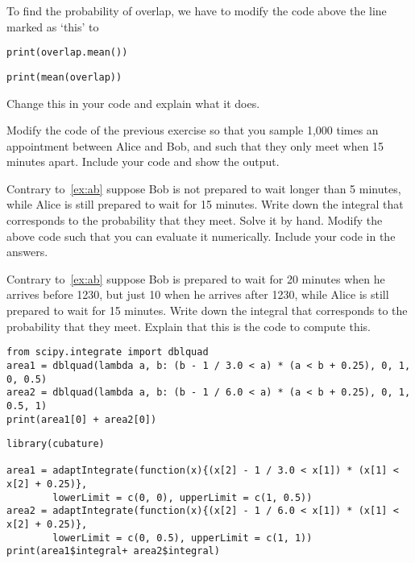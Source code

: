\begin{exercise}
To find the probability of overlap, we have to modify the code above the line marked as `this' to
\begin{verbatim}
print(overlap.mean())
\end{verbatim}

\begin{verbatim}
print(mean(overlap))
\end{verbatim}

Change this in your code and explain what it does.
\end{exercise}


\begin{exercise}
Modify the  code of the previous exercise so that you sample 1,000 times an appointment between Alice and Bob, and such that they only meet when 15 minutes apart. Include your code and show the output.
\end{exercise}


\begin{exercise}
Contrary to~\cref{ex:ab} suppose Bob is not prepared to wait longer than 5 minutes, while Alice is still prepared to wait for 15 minutes. Write down the integral that corresponds to the probability that they meet.  Solve it by hand. Modify the above code such that you can evaluate it numerically. Include your code in the answers.
\end{exercise}

\begin{exercise}
Contrary to~\cref{ex:ab} suppose Bob is prepared to wait for 20 minutes when he arrives before 1230, but just 10 when he arrives after 1230, while Alice is still prepared to wait for 15 minutes. Write down the integral that corresponds to the probability that they meet. Explain that this is the code to compute this.

\begin{verbatim}
from scipy.integrate import dblquad
area1 = dblquad(lambda a, b: (b - 1 / 3.0 < a) * (a < b + 0.25), 0, 1, 0, 0.5)
area2 = dblquad(lambda a, b: (b - 1 / 6.0 < a) * (a < b + 0.25), 0, 1, 0.5, 1)
print(area1[0] + area2[0])
\end{verbatim}

\begin{verbatim}
library(cubature)   

area1 = adaptIntegrate(function(x){(x[2] - 1 / 3.0 < x[1]) * (x[1] < x[2] + 0.25)},
		lowerLimit = c(0, 0), upperLimit = c(1, 0.5))
area2 = adaptIntegrate(function(x){(x[2] - 1 / 6.0 < x[1]) * (x[1] < x[2] + 0.25)}, 
		lowerLimit = c(0, 0.5), upperLimit = c(1, 1))
print(area1$integral+ area2$integral)
\end{verbatim}

\end{exercise}

